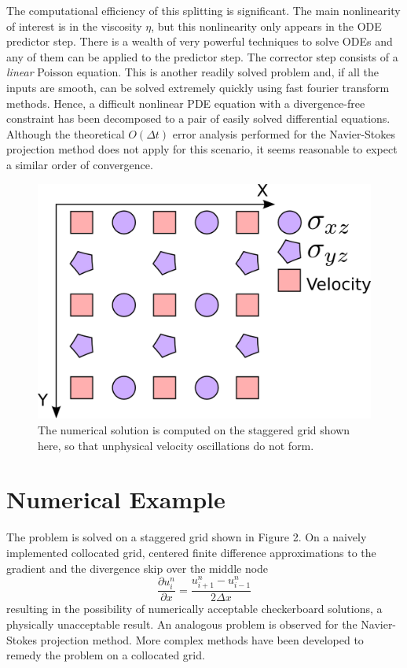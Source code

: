 \documentclass[a4paper]{article}
\begin{document}
The computational efficiency of this splitting is significant. 
The main nonlinearity of interest is in the viscosity $\eta$, but this nonlinearity only appears in the ODE predictor step. There is a wealth
of very powerful techniques to solve ODEs and any of them can be applied to the predictor step. The corrector step consists of a \textit{linear} Poisson equation.
This is another readily solved problem and, if all the inputs are smooth, can be solved extremely quickly using fast fourier transform methods.
Hence, a difficult nonlinear PDE equation with a divergence-free constraint has been decomposed to a pair of easily solved differential equations. 
Although the theoretical $O(\Delta t)$ error analysis performed for the Navier-Stokes projection method does not apply for this scenario, it seems reasonable
to expect a similar order of convergence. 


\begin{figure}[h!]
  \caption{The numerical solution is computed on the staggered grid shown here, so that unphysical velocity oscillations do not form.}
  \centering
    \includegraphics[width=1.0\textwidth]{staggered_grid.png}
\end{figure}
\section{Numerical Example}
The problem is solved on a staggered grid shown in Figure 2. On a naively implemented collocated grid, centered finite difference
approximations to the gradient and the divergence skip over the middle node
\begin{equation}
    \frac{\partial u_i^n}{\partial x} = \frac{u_{i+1}^n - u_{i-1}^n}{2\Delta x}
\end{equation}
resulting in the possibility of numerically acceptable checkerboard solutions, a physically unacceptable result. An analogous problem
is observed for the Navier-Stokes projection method. More complex methods have been developed to remedy the problem on a collocated grid.
\end{document}
